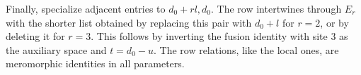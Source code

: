 Finally, specialize adjacent entries to \(d_0+rl,d_0\). The row intertwines through \(E_r\) with the shorter list obtained by replacing this pair with \(d_0+l\) for \(r=2\), or by deleting it for \(r=3\). This follows by inverting the fusion identity with site 3 as the auxiliary space and \(t=d_0-u\). The row relations, like the local ones, are meromorphic identities in all parameters.
